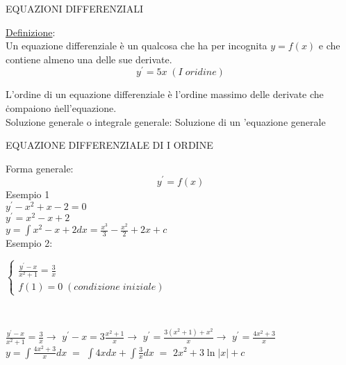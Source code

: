 \documentclass[20pt]{article}
\begin{document}
    \begin{center}
        \begin{Large}
            EQUAZIONI DIFFERENZIALI\\[10pt]
        \end{Large}
    \end{center}

    \underline{Definizione}:\\[5pt]
    Un equazione differenziale è un qualcosa che ha per incognita \underline{$y=f(x)$} e che contiene almeno una delle sue derivate.
    $$y^{'}=5x \; (I \; oridine)$$

    L'ordine di un equazione differenziale è l'ordine massimo     delle derivate che \. compaiono \. nell'equazione.
    \\[5pt]
    Soluzione generale o integrale generale: Soluzione di un         'equazione generale
    \\[17pt]

    \begin{center}
    EQUAZIONE DIFFERENZIALE DI I ORDINE\\[10pt]
    \end{center}
    Forma generale:
    $$y^{'}=f(x)$$
    Esempio 1\\[10pt]
    $y^{'}-x^2+x-2=0$\\
    $y^{'} = x^2-x+2$\\
    $y=\int x^2-x+2 dx = \frac{x^3}{3}-\frac{x^2}{2}+2x+c$\\[5pt]
    
    Esempio 2:\\[10pt]
    \begin{large}
        \begin{math}
          \left\{
            \begin{array}{l}
              \frac{y^{'}-x}{x^2+1} = \frac{3}{x}\\
              f(1)=0 \; (condizione \; iniziale)
            \end{array}
          \right.
        \end{math}
    \end{large}\\[5pt]
    
    \begin{large}
        $\frac{y^{'}-x}{x^2+1} = \frac{3}{x} \rightarrow$ 
        $y^{'}-x = 3 \frac{x^2+1}{x} \rightarrow$
        $y^{'}=\frac{3(x^2+1)+x^2}{x} \rightarrow$
        $y^{'}=\frac{4x^2+3}{x} $\\[5pt]
        $y=\int{\frac{4x^2+3}{x} dx} \; = $
        $\int{4x}dx + \int{\frac{3}{x} dx} \; = $
        $2x^2+3 \ln{|x|}+c$\\
    \end{large}
    
\end{document}
